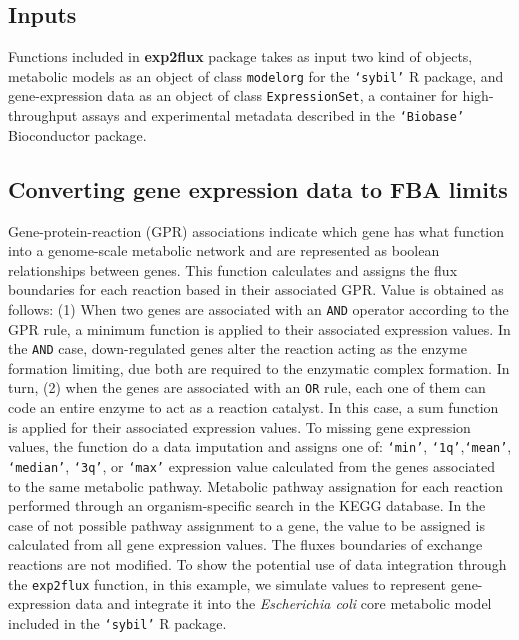 \subsection*{Inputs}
Functions included in \textbf{exp2flux} package takes as input two kind of objects, metabolic models as an object of class \texttt{modelorg} for the \texttt{`sybil'} R package, and gene-expression data as an object of class \texttt{ExpressionSet}, a container for high-throughput assays and experimental metadata described in the \texttt{`Biobase'} Bioconductor package. 
\subsection*{Converting gene expression data to FBA limits}
Gene-protein-reaction (GPR) associations indicate which gene has what function into a genome-scale metabolic network and are represented as boolean relationships between genes. This function calculates and assigns the flux boundaries for each reaction based in their associated GPR. Value is obtained as follows: (1) When two genes are associated with an \texttt{AND} operator according to the GPR rule, a minimum function is applied to their associated expression values. In the \texttt{AND} case, down-regulated genes alter the reaction acting as the enzyme formation limiting, due both are required to the enzymatic complex formation. In turn, (2) when the genes are associated with an \texttt{OR} rule, each one of them can code an entire enzyme to act as a reaction catalyst. In this case, a sum function is applied for their associated expression values.  To missing gene expression values, the function do a data imputation and assigns one of: \texttt{`min'}, \texttt{`1q'},\texttt{`mean'}, \texttt{`median'}, \texttt{`3q'}, or \texttt{`max'} expression value calculated from the genes associated to the same metabolic pathway. Metabolic pathway assignation for each reaction performed through an organism-specific search in the KEGG database. In the case of not possible pathway assignment to a gene, the value to be assigned is calculated from all gene expression values. The fluxes boundaries of exchange reactions are not modified.
To show the potential use of data integration through the \texttt{exp2flux} function, in this example, we simulate values to represent gene-expression data and integrate it into the \emph{Escherichia coli} core metabolic model included in the \texttt{`sybil'} R package. \\

